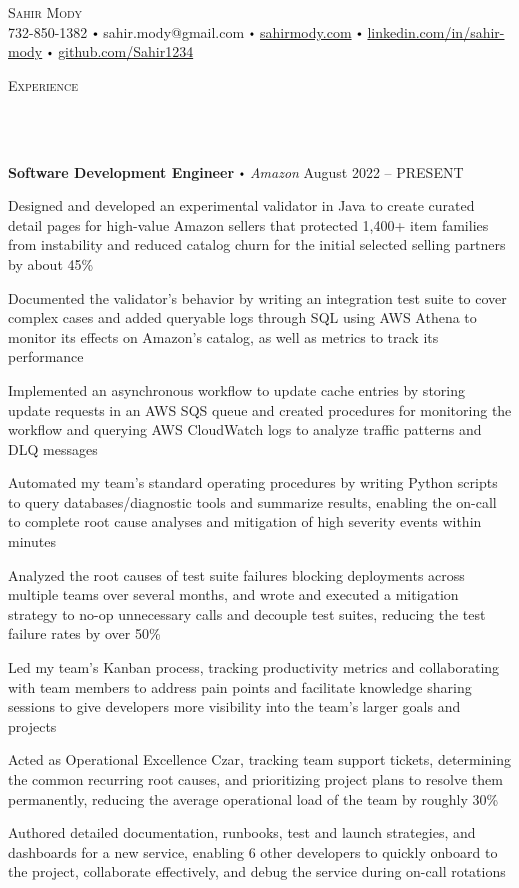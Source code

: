 \documentclass{article}
\newcommand{\contact}[3]{
\vspace*{3pt}
\begin{center}
{\Huge \scshape {#1}}\\
\vspace{0pt}
#2 
\vspace{0pt}
#3
\end{center}
\vspace*{-3pt}
}
\newcommand{\header}[1]{{
\hspace*{-15pt}\vspace*{10pt} \large \scshape{#1}} \vspace*{-6pt} 
\lineunder
}
\newcommand{\lineunder}{
\vspace*{-8pt} \\ \hspace*{-18pt} 
\hrulefill \\
}
\newcommand{\employer}[4]{
\textbf{#1} \labelitemi \textit{#2} \hfill #3 \\ #4 \vspace*{3pt}
}
\renewcommand{\labelitemi}{
$\vcenter{\hbox{\tiny$\bullet$}}$\hspace*{3pt}
}
\renewcommand{\labelitemii}{
$\vcenter{\hbox{\tiny$\bullet$}}$\hspace*{-3pt}
}
\newenvironment{bullet-list-minor}{
\begin{list}{\labelitemii}{\setlength\leftmargin{15pt} 
\topsep 0pt \itemsep 1pt}}{\vspace*{4pt}\end{list}
}
\begin{document}
\small
\vspace*{-64pt}

\contact{Sahir Mody}\bigskip
{{732-850-1382}\labelitemi{sahir.mody@gmail.com}\labelitemi\href{https://sahirmody.com}{sahirmody.com}\labelitemi\href{https://www.linkedin.com/in/sahir-mody}{linkedin.com/in/sahir-mody}  \labelitemi\href{https://www.github.com/Sahir1234}{github.com/Sahir1234}}
\medskip
\header{Experience}
    \vspace{4pt}
    \employer{Software Development Engineer}{Amazon}{August 2022 -- PRESENT}{}
	\begin{bullet-list-minor}
        \item Designed and developed an experimental validator in Java to create curated detail pages for high-value Amazon sellers that protected 1,400+ item families from instability and reduced catalog churn for the initial selected selling partners by about 45\%
        \item Documented the validator's behavior by writing an integration test suite to cover complex cases and added queryable logs through SQL using AWS Athena to monitor its effects on Amazon's catalog, as well as metrics to track its performance
        \item Implemented an asynchronous workflow to update cache entries by storing update requests in an AWS SQS queue and created procedures for monitoring the workflow and querying AWS CloudWatch logs to analyze traffic patterns and DLQ messages
        \item Automated my team's standard operating procedures by writing Python scripts to query databases/diagnostic tools and summarize results, enabling the on-call to complete root cause analyses and mitigation of high severity events within minutes
        \item Analyzed the root causes of test suite failures blocking deployments across multiple teams over several months, and wrote and executed a mitigation strategy to no-op unnecessary calls and decouple test suites, reducing the test failure rates by over 50\%
        \item Led my team's Kanban process, tracking productivity metrics and collaborating with team members to address pain points and facilitate knowledge sharing sessions to give developers more visibility into the team's larger goals and projects
        \item Acted as Operational Excellence Czar, tracking team support tickets, determining the common recurring root causes, and prioritizing project plans to resolve them permanently, reducing the average operational load of the team by roughly 30\%
        \item Authored detailed documentation, runbooks, test and launch strategies, and dashboards for a new service, enabling 6 other developers to quickly onboard to the project, collaborate effectively, and debug the service during on-call rotations
    \end{bullet-list-minor}
    \medskip
    
\end{document}
